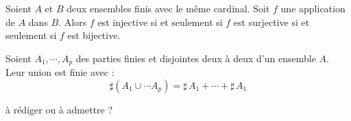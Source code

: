 \begin{prop}[\ref{pN: CarBij}]
Soient $A$ et $B$ deux ensembles finis avec le même cardinal. Soit $f$ une application de $A$ dans $B$. Alors $f$ est injective si et seulement si $f$ est surjective si et seulement si $f$ est bijective.
\end{prop}

\begin{prop}[\ref{pN: SomCard}]
 Soient $A_1,\cdots,A_p$ des parties finies et disjointes deux à deux d'un ensemble $A$. Leur union est finie avec :
\begin{displaymath}
 \sharp\left(A_1 \cup \cdots A_p \right) = \sharp\, A_1 + \cdots + \sharp\, A_1 
\end{displaymath}
\end{prop}
\begin{demo}
 à rédiger ou à admettre ?
\end{demo}

